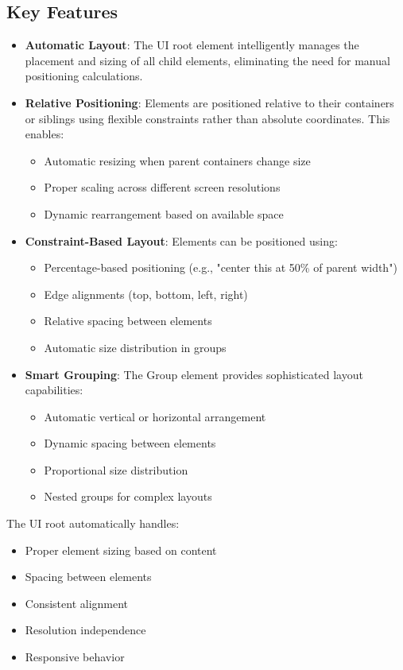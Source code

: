 \documentclass[a4paper,11pt]{article}
\begin{document}
\subsection*{Key Features}
\begin{itemize}
    \item \textbf{Automatic Layout}: The UI root element intelligently manages the placement and sizing of all child elements, eliminating the need for manual positioning calculations.
    
    \item \textbf{Relative Positioning}: Elements are positioned relative to their containers or siblings using flexible constraints rather than absolute coordinates. This enables:
    \begin{itemize}
        \item Automatic resizing when parent containers change size
        \item Proper scaling across different screen resolutions
        \item Dynamic rearrangement based on available space
    \end{itemize}
    
    \item \textbf{Constraint-Based Layout}: Elements can be positioned using:
    \begin{itemize}
        \item Percentage-based positioning (e.g., "center this at 50\% of parent width")
        \item Edge alignments (top, bottom, left, right)
        \item Relative spacing between elements
        \item Automatic size distribution in groups
    \end{itemize}
    
    \item \textbf{Smart Grouping}: The Group element provides sophisticated layout capabilities:
    \begin{itemize}
        \item Automatic vertical or horizontal arrangement
        \item Dynamic spacing between elements
        \item Proportional size distribution
        \item Nested groups for complex layouts
    \end{itemize}
\end{itemize}
The UI root automatically handles:
\begin{itemize}
    \item Proper element sizing based on content
    \item Spacing between elements
    \item Consistent alignment
    \item Resolution independence
    \item Responsive behavior
\end{itemize}
\end{document}
